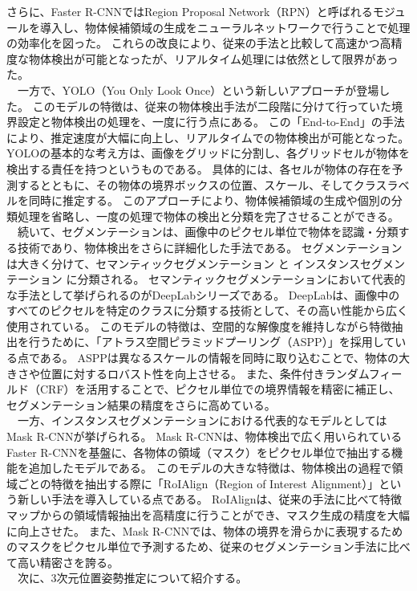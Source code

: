 さらに、Faster R-CNNではRegion Proposal Network（RPN）と呼ばれるモジュールを導入し、物体候補領域の生成をニューラルネットワークで行うことで処理の効率化を図った。
これらの改良により、従来の手法と比較して高速かつ高精度な物体検出が可能となったが、リアルタイム処理には依然として限界があった。\\
　一方で、YOLO（You Only Look Once）という新しいアプローチが登場した。
このモデルの特徴は、従来の物体検出手法が二段階に分けて行っていた境界設定と物体検出の処理を、一度に行う点にある。
この「End-to-End」の手法により、推定速度が大幅に向上し、リアルタイムでの物体検出が可能となった。
YOLOの基本的な考え方は、画像をグリッドに分割し、各グリッドセルが物体を検出する責任を持つというものである。
具体的には、各セルが物体の存在を予測するとともに、その物体の境界ボックスの位置、スケール、そしてクラスラベルを同時に推定する。
このアプローチにより、物体候補領域の生成や個別の分類処理を省略し、一度の処理で物体の検出と分類を完了させることができる。\\
　続いて、セグメンテーションは、画像中のピクセル単位で物体を認識・分類する技術であり、物体検出をさらに詳細化した手法である。
セグメンテーションは大きく分けて、セマンティックセグメンテーション と インスタンスセグメンテーション に分類される。
セマンティックセグメンテーションにおいて代表的な手法として挙げられるのがDeepLabシリーズである。
DeepLabは、画像中のすべてのピクセルを特定のクラスに分類する技術として、その高い性能から広く使用されている。
このモデルの特徴は、空間的な解像度を維持しながら特徴抽出を行うために、「アトラス空間ピラミッドプーリング（ASPP）」を採用している点である。
ASPPは異なるスケールの情報を同時に取り込むことで、物体の大きさや位置に対するロバスト性を向上させる。
また、条件付きランダムフィールド（CRF）を活用することで、ピクセル単位での境界情報を精密に補正し、セグメンテーション結果の精度をさらに高めている。\\
　一方、インスタンスセグメンテーションにおける代表的なモデルとしてはMask R-CNNが挙げられる。
Mask R-CNNは、物体検出で広く用いられているFaster R-CNNを基盤に、各物体の領域（マスク）をピクセル単位で抽出する機能を追加したモデルである。
このモデルの大きな特徴は、物体検出の過程で領域ごとの特徴を抽出する際に「RoIAlign（Region of Interest Alignment）」という新しい手法を導入している点である。
RoIAlignは、従来の手法に比べて特徴マップからの領域情報抽出を高精度に行うことができ、マスク生成の精度を大幅に向上させた。
また、Mask R-CNNでは、物体の境界を滑らかに表現するためのマスクをピクセル単位で予測するため、従来のセグメンテーション手法に比べて高い精密さを誇る。\\
　次に、3次元位置姿勢推定について紹介する。
